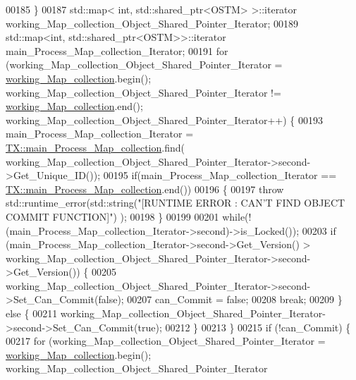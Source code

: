 \begin{DoxyCode}
00185     \} 
00187     std::map< int, std::shared\_ptr<OSTM> >::iterator working\_Map\_collection\_Object\_Shared\_Pointer\_Iterator;
00189     std::map<int, std::shared\_ptr<OSTM>>::iterator main\_Process\_Map\_collection\_Iterator;
00191     \textcolor{keywordflow}{for} (working\_Map\_collection\_Object\_Shared\_Pointer\_Iterator = 
      \hyperlink{class_t_x_a81aafda16e2f20e36ec6c68e584668ff_a81aafda16e2f20e36ec6c68e584668ff}{working\_Map\_collection}.begin(); working\_Map\_collection\_Object\_Shared\_Pointer\_Iterator
       != \hyperlink{class_t_x_a81aafda16e2f20e36ec6c68e584668ff_a81aafda16e2f20e36ec6c68e584668ff}{working\_Map\_collection}.end(); 
      working\_Map\_collection\_Object\_Shared\_Pointer\_Iterator++) \{
00193             main\_Process\_Map\_collection\_Iterator = 
      \hyperlink{class_t_x_a1a45d726894190695314464d7cd97c29_a1a45d726894190695314464d7cd97c29}{TX::main\_Process\_Map\_collection}.find(
      working\_Map\_collection\_Object\_Shared\_Pointer\_Iterator->second->Get\_Unique\_ID());
00195             \textcolor{keywordflow}{if}(main\_Process\_Map\_collection\_Iterator == 
      \hyperlink{class_t_x_a1a45d726894190695314464d7cd97c29_a1a45d726894190695314464d7cd97c29}{TX::main\_Process\_Map\_collection}.end())
00196             \{
00197                 \textcolor{keywordflow}{throw} std::runtime\_error(std::string(\textcolor{stringliteral}{"[RUNTIME ERROR : CAN'T FIND OBJECT COMMIT FUNCTION]"})
      );
00198             \}
00199 
00201         \textcolor{keywordflow}{while}(!(main\_Process\_Map\_collection\_Iterator->second)->is\_Locked());
00203         \textcolor{keywordflow}{if} (main\_Process\_Map\_collection\_Iterator->second->Get\_Version() > 
      working\_Map\_collection\_Object\_Shared\_Pointer\_Iterator->second->Get\_Version()) \{
00205             working\_Map\_collection\_Object\_Shared\_Pointer\_Iterator->second->Set\_Can\_Commit(\textcolor{keyword}{false});
00207             can\_Commit = \textcolor{keyword}{false};
00208             \textcolor{keywordflow}{break};
00209         \} \textcolor{keywordflow}{else} \{
00211             working\_Map\_collection\_Object\_Shared\_Pointer\_Iterator->second->Set\_Can\_Commit(\textcolor{keyword}{true});
00212         \}
00213     \}
00215     \textcolor{keywordflow}{if} (!can\_Commit) \{
00217         \textcolor{keywordflow}{for} (working\_Map\_collection\_Object\_Shared\_Pointer\_Iterator = 
      \hyperlink{class_t_x_a81aafda16e2f20e36ec6c68e584668ff_a81aafda16e2f20e36ec6c68e584668ff}{working\_Map\_collection}.begin(); working\_Map\_collection\_Object\_Shared\_Pointer\_Iterator

\end{DoxyCode}
